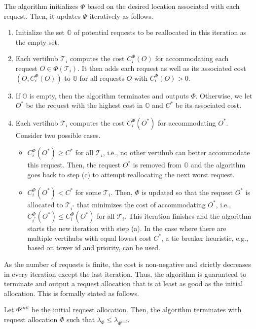The algorithm initializes $\Phi$ based on the desired location associated with each request. Then, it updates $\Phi$ iteratively as follows.
\begin{enumerate}
	\item Initialize the set $\mathbb{O}$ of potential requests to be reallocated in this iteration as the empty set.
	\item Each vertihub $\mathcal{T}_i$ computes the cost $C_i^\Phi(O)$ for accommodating each request $O \in \Phi(\mathcal{T}_i)$. It then adds each request as well as its associated cost $(O, C_i^\Phi(O))$ to $\mathbb{O}$ for all requests $O$ with $C_i^\Phi(O) > 0$.
	\item If $\mathbb{O}$ is empty, then the algorithm terminates and outputs $\Phi$. Otherwise, we let $O^*$ be the request with the highest cost in $\mathbb{O}$ and $C^*$ be its associated cost.
	\item Each vertihub $\mathcal{T}_i$ computes the cost $C_i^\Phi(O^*)$ for accommodating $O^*$. Consider two possible cases.
	\begin{itemize}
		\item $C_i^\Phi(O^*) \geq C^*$ for all $\mathcal{T}_i$, i.e., no other vertihub can better accommodate this request. Then, the request $O^*$ is removed from $\mathbb{O}$ and the algorithm goes back to step (c) to attempt reallocating the next worst request.
		\item $C_i^\Phi(O^*) < C^*$ for some $\mathcal{T}_i$. Then, $\Phi$ is updated so that the request $O^*$ is allocated to $\mathcal{T}_{i^*}$ that minimizes the cost of accommodating $O^*$, i.e., $C_{i^*}^\Phi(O^*) \leq C_i^\Phi(O^*)$ for all $\mathcal{T}_i$. This iteration finishes and the algorithm starts the new iteration with step (a). In the case where there are multiple vertihubs with equal lowest cost $C^{\ast}$, a tie breaker heuristic, e.g., based on tower id and priority, can be used.
	\end{itemize}
\end{enumerate}

As the number of requests is finite, the cost is non-negative and strictly decreases in every iteration except the last iteration.  Thus, the algorithm is guaranteed to terminate and output a request allocation that is at least as good as the initial allocation.  This is formally stated as follows.

\begin{prop}
	Let $\Phi^{init}$ be the initial request allocation. Then, the algorithm terminates with request allocation $\Phi$ such that $\lambda_{\Phi} \leq \lambda_{\Phi^{init}}$.
	
\end{prop}

